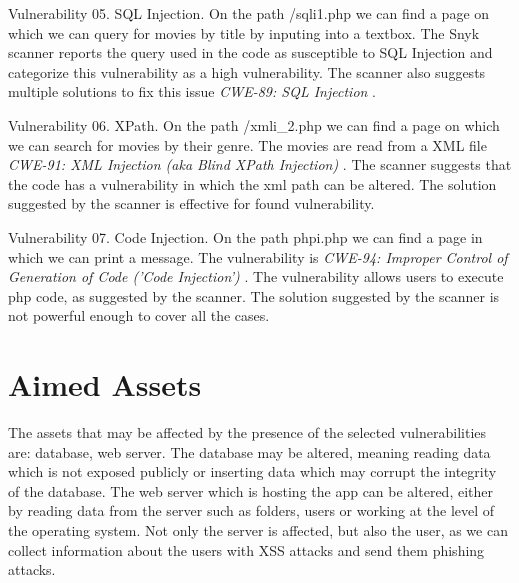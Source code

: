 \documentclass{article}
\begin{document}
\par Vulnerability 05. SQL Injection. On the path /sqli1.php we can find a page on which we can query for movies by title by inputing into a textbox. The Snyk scanner reports the query used in the code as susceptible to SQL Injection and categorize this vulnerability as a high vulnerability. The scanner also suggests multiple solutions to fix this issue \textit{CWE-89: SQL Injection}  \cite{Vuln001}.
\par Vulnerability 06. XPath. On the path /xmli\_2.php we can find a page on which we can search for movies by their genre. The movies are read from a XML file \textit{CWE-91: XML Injection (aka Blind XPath Injection)} \cite{vul:xpath}. The scanner suggests that the code has a vulnerability in which the xml path can be altered. The solution suggested by the scanner is effective for found vulnerability.
\par Vulnerability 07. Code Injection. On the path phpi.php we can find a page in which we can print a message. The vulnerability is \textit{
    CWE-94: Improper Control of Generation of Code ('Code Injection')} \cite{vul:code-injection}. The vulnerability allows users to execute php code, as suggested by the scanner. The solution suggested by the scanner is not powerful enough to cover all the cases.

\section{Aimed Assets}
\label{}
\par The assets that may be affected by the presence of the selected vulnerabilities are: database, web server. The database may be altered, meaning reading data which is not exposed publicly or inserting data which may corrupt the integrity of the database. The web server which is hosting the app can be altered, either by reading data from the server such as folders, users or working at the level of the operating system.
Not only the server is affected, but also the user, as we can collect information about the users with XSS attacks and send them phishing attacks.
\end{document}
